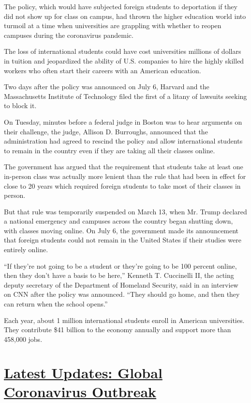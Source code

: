 The policy, which would have subjected foreign students to deportation
if they did not show up for class on campus, had thrown the higher
education world into turmoil at a time when universities are grappling
with whether to reopen campuses during the coronavirus pandemic.

The loss of international students could have cost universities millions
of dollars in tuition and jeopardized the ability of U.S. companies to
hire the highly skilled workers who often start their careers with an
American education.

Two days after the policy was announced on July 6, Harvard and the
Massachusetts Institute of Technology filed the first of a litany of
lawsuits seeking to block it.

On Tuesday, minutes before a federal judge in Boston was to hear
arguments on their challenge, the judge, Allison D. Burroughs, announced
that the administration had agreed to rescind the policy and allow
international students to remain in the country even if they are taking
all their classes online.

The government has argued that the requirement that students take at
least one in-person class was actually more lenient than the rule that
had been in effect for close to 20 years which required foreign students
to take most of their classes in person.

But that rule was temporarily suspended on March 13, when Mr. Trump
declared a national emergency and campuses across the country began
shutting down, with classes moving online. On July 6, the government
made its announcement that foreign students could not remain in the
United States if their studies were entirely online.

``If they're not going to be a student or they're going to be 100
percent online, then they don't have a basis to be here,'' Kenneth T.
Cuccinelli II, the acting deputy secretary of the Department of Homeland
Security, said in an interview on CNN after the policy was announced.
``They should go home, and then they can return when the school opens.''

Each year, about 1 million international students enroll in American
universities. They contribute \$41 billion to the economy annually and
support more than 458,000 jobs.

\hypertarget{latest-updates-global-coronavirus-outbreak}{%
\section{\texorpdfstring{\href{https://www.nytimes.com/2020/08/01/world/coronavirus-covid-19.html?action=click\&pgtype=Article\&state=default\&region=MAIN_CONTENT_1\&context=storylines_live_updates}{Latest
Updates: Global Coronavirus
Outbreak}}{Latest Updates: Global Coronavirus Outbreak}}\label{latest-updates-global-coronavirus-outbreak}}

